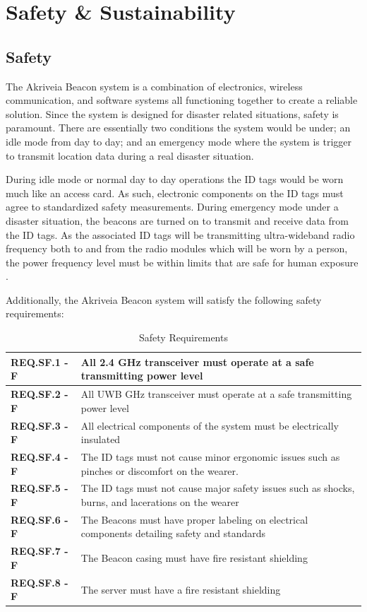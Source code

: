 

 \setcounter{section}{4}
\section{Safety \& Sustainability}
\bigskip
\subsection{Safety}
\medskip
The Akriveia Beacon system is a combination of electronics, wireless communication, and software systems all functioning together to create a reliable solution. Since the system is designed for disaster related situations, safety is paramount. There are essentially two conditions the system would be under; an idle mode from day to day; and an emergency mode where the system is trigger to transmit location data during a real disaster situation.

\bigskip
During idle mode or normal day to day operations the ID tags would be worn much like an access card. As such, electronic components on the ID tags must agree to standardized safety measurements. During emergency mode under a disaster situation, the beacons are turned on to transmit and receive data from the ID tags. As the associated ID tags will be transmitting ultra-wideband radio frequency both to and from the radio modules which will be worn by a person, the power frequency level must be within limits that are safe for human exposure \cite{R22}.
 
\bigskip
Additionally, the Akriveia Beacon system will satisfy the following safety requirements:

\bgroup
\def\arraystretch{1.5}
\begin{table}[H]
\centering
\begin{tabular}{ | m{3cm} | m{13cm}| } 
\hline
\textbf{REQ.SF.1 - F} & All 2.4 GHz transceiver must operate at a safe transmitting power level\\
\hline
\textbf{REQ.SF.2 - F} &  All UWB GHz transceiver must operate at a safe transmitting power level\\
\hline
\textbf{REQ.SF.3 - F} & All electrical components of the system must be electrically insulated \\
\hline
\textbf{REQ.SF.4 - F} & The ID tags must not cause minor ergonomic issues such as pinches or discomfort on the wearer.\\
\hline
\textbf{REQ.SF.5 - F} & The ID tags must not cause major safety issues such as shocks, burns, and lacerations on the wearer\\
\hline
\textbf{REQ.SF.6 - F} & The Beacons must have proper labeling on electrical components detailing safety and standards \\
\hline
\textbf{REQ.SF.7 - F} & The Beacon casing must have fire resistant shielding \\
\hline
\textbf{REQ.SF.8 - F} & The server must have a fire resistant shielding \\
\hline
\end{tabular}
\caption{Safety Requirements}
\end{table}	

